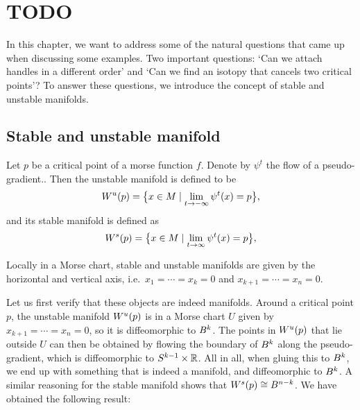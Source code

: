 \chapter{TODO}


In this chapter, we want to address some of the natural questions that came up when discussing some examples.
Two important questions: `Can we attach handles in a different order' and `Can we find an isotopy that cancels two critical points'?
To answer these questions, we introduce the concept of stable and unstable manifolds.

\section{Stable and unstable manifold}


\begin{definition}
    Let $p$ be a critical point of a morse function $f$.
    Denote by $\psi^{t}$ the flow of a pseudo-gradient..
    Then the unstable manifold is defined to be
    \[
        W^u(p) = \big\{x \in M  \mid  \lim_{t \to -\infty} \psi^{t} (x)  = p\big\} 
    ,\] 
    and its stable manifold is defined as
    \[
        W^s(p) = \big\{x \in M  \mid  \lim_{t \to \infty} \psi^{t} (x)  = p\big\} 
    ,\] 
\end{definition}
\begin{marginfigure}
    \centering
    \caption{Locally in a Morse chart, stable and unstable manifolds are given by the horizontal and vertical axis, i.e.\ $ x_1= \cdots= x_k = 0$ and $x_{k+1}= \cdots= x_n = 0$.}
    \label{fig:stable-and-unstable-manifolds-are-manifiolds}
\end{marginfigure}
Let us first verify that these objects are indeed manifolds. 
Around a critical point $p$, the unstable manifold $W^u(p)$ is in a Morse chart $U$ given by $x_{k+1} = \cdots = x_n = 0$, so it is diffeomorphic to $B^{k}$.
The points in $W^u(p)$ that lie outside $U$ can then be obtained by flowing the boundary of $B^{k}$ along the pseudo-gradient, which is diffeomorphic to $S^{k-1} \times \mathbb{R}$. All in all, when gluing this to $B^{k}$, we end up with something that is indeed a manifold, and diffeomorphic to $B^{k}$.
A similar reasoning for the stable manifold shows that $W^s(p) \cong B^{n - k}$.
We have obtained the following result:

